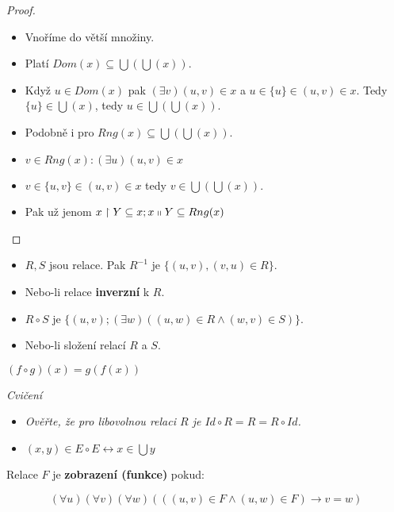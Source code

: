 \begin{proof}
	\begin{itemize}
		\item Vnoříme do větší množiny.
		\item Platí $Dom(x) \subseteq \bigcup( \bigcup(x))$.
		\item Když $u \in Dom(x)$ pak $(\exists v)(u,v) \in x$ a $u \in \{u\} \in (u,v) \in x$. Tedy $\{u\} \in \bigcup (x)$, tedy $u \in \bigcup(\bigcup(x))$.
		\item Podobně i pro $Rng(x) \subseteq \bigcup(\bigcup(x))$.
		\item $v \in Rng(x): (\exists u)(u,v) \in x$
		\item $v \in \{u,v\} \in (u,v) \in x$ tedy $v \in \bigcup(\bigcup(x))$.
		\item Pak už jenom $x \upharpoonright Y \subseteq x; x \shortparallel Y \subseteq Rng(x)$
	\end{itemize}
\end{proof}

\begin{definice}
	\begin{itemize}
		\item $R,S$ jsou relace. Pak $R^{-1}$ je $\{(u,v), (v,u) \in R\}$.
		\item Nebo-li relace \textbf{inverzní} k $R$.
		\item $R \circ S$ je $\{(u,v); (\exists w)((u,w)\in R \land (w,v) \in S)\}$.
		\item Nebo-li složení relací $R$ a $S$.
	\end{itemize}
\end{definice}

\begin{pozn}
	$(f \circ g)(x) = g(f(x))$
\end{pozn}

\textit{Cvičení}

\begin{itemize}
	\item \textit{Ověřte, že pro libovolnou relaci $R$ je $Id \circ R = R = R \circ Id$.}
	\item \textit{$(x,y) \in E \circ E \leftrightarrow x \in \bigcup y$}
\end{itemize}

\begin{definice}
	Relace $F$ je \textbf{zobrazení (funkce)} pokud:
	
	$$
	(\forall u)(\forall v)(\forall w)(((u,v) \in F \land (u,w) \in F) \rightarrow v = w)
	$$
\end{definice}

